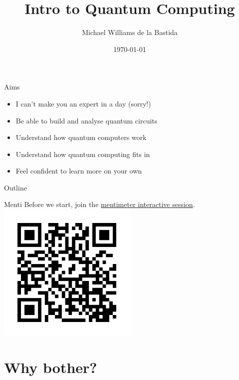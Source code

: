 \documentclass{beamer}
\title{Intro to Quantum Computing}
\author{Michael Williams de la Bastida}
\institute{UCL}
\date{\today}
\begin{document}
\begin{frame}
    \titlepage
\end{frame}

\begin{frame}{Aims}
    \begin{itemize}
        \item I can't make you an expert in a day (sorry!)
        \item Be able to build and analyse quantum circuits
        \item Understand how quantum computers work
        \item Understand how quantum computing fits in
        \item Feel confident to learn more on your own
    \end{itemize}
\end{frame}

\begin{frame}[label=toc]{Outline}
    \tableofcontents
\end{frame}

\begin{frame}{Menti}
    \centering
    Before we start, join the \hyperlink{https://www.menti.com/alrt9by4cu4i}{mentimeter interactive session}.\vfill
    \hyperlink{https://www.menti.com/alrt9by4cu4i}{\includegraphics[width=0.5\textwidth]{images/mentimeter_qr_code.png}}
\end{frame}

\section{Why bother?}
\end{document}
